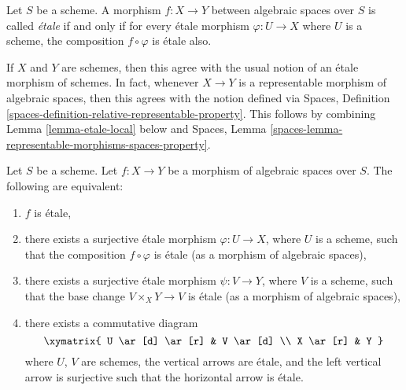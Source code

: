 \begin{definition}
\label{definition-etale}
Let $S$ be a scheme.
A morphism $f : X \to Y$ between algebraic spaces over $S$ is
called {\it \'etale} if and only if for every \'etale morphism
$\varphi : U \to X$ where $U$ is a scheme, the composition
$f \circ \varphi$ is \'etale also.
\end{definition}

\noindent
If $X$ and $Y$ are schemes, then this agree with the usual notion of an
\'etale morphism of schemes. In fact, whenever $X \to Y$ is a representable
morphism of algebraic spaces, then this agrees with the notion defined via
Spaces, Definition \ref{spaces-definition-relative-representable-property}.
This follows by combining Lemma \ref{lemma-etale-local} below and
Spaces, Lemma \ref{spaces-lemma-representable-morphisms-spaces-property}.

\begin{lemma}
\label{lemma-etale-local}
Let $S$ be a scheme.
Let $f : X \to Y$ be a morphism of algebraic spaces over $S$.
The following are equivalent:
\begin{enumerate}
\item $f$ is \'etale,
\item there exists a surjective \'etale morphism $\varphi : U \to X$,
where $U$ is a scheme, such that the composition $f \circ \varphi$ is
\'etale (as a morphism of algebraic spaces),
\item there exists a surjective \'etale morphism $\psi : V \to Y$,
where $V$ is a scheme, such that the base change $V \times_X Y \to V$
is \'etale (as a morphism of algebraic spaces),
\item there exists a commutative diagram
$$
\xymatrix{
U \ar[d] \ar[r] & V \ar[d] \\
X \ar[r] & Y
}
$$
where $U$, $V$ are schemes, the vertical arrows are \'etale, and the
left vertical arrow is surjective such that the horizontal arrow is \'etale.
\end{enumerate}
\end{lemma}

